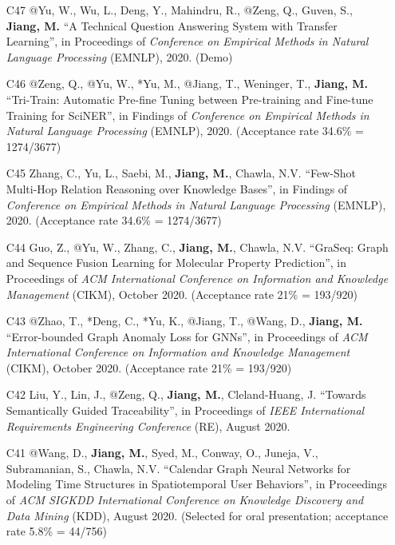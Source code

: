 \documentclass[10pt]{article}
\newenvironment{myindentpar}[1]%
{\begin{list}{}%
         {\setlength{\leftmargin}{#1}}%
         \item[]%
}
{\end{list}}
\newcounter{list}
\begin{document}
\begin{myindentpar}{0.00cm}
\begin{enumerate}[leftmargin=.5cm]
\item[C47] @Yu, W., Wu, L., Deng, Y., Mahindru, R., @Zeng, Q., Guven, S., \textbf{Jiang, M.} ``A Technical Question Answering System with Transfer Learning'', in Proceedings of \textit{Conference on Empirical Methods in Natural Language Processing} (EMNLP), 2020. (Demo)
		
\item[C46] @Zeng, Q., @Yu, W., *Yu, M., @Jiang, T., Weninger, T., \textbf{Jiang, M.} ``Tri-Train: Automatic Pre-fine Tuning between Pre-training and Fine-tune Training for SciNER'', in Findings of \textit{Conference on Empirical Methods in Natural Language Processing} (EMNLP), 2020. (Acceptance rate 34.6\% = 1274/3677)

\item[C45] Zhang, C., Yu, L., Saebi, M., \textbf{Jiang, M.}, Chawla, N.V. ``Few-Shot Multi-Hop Relation Reasoning over Knowledge Bases'', in Findings of \textit{Conference on Empirical Methods in Natural Language Processing} (EMNLP), 2020. (Acceptance rate 34.6\% = 1274/3677)

\item[C44] Guo, Z., @Yu, W., Zhang, C., \textbf{Jiang, M.}, Chawla, N.V. ``GraSeq: Graph and Sequence Fusion Learning for Molecular Property Prediction'', in Proceedings of \textit{ACM International Conference on Information and Knowledge Management} (CIKM), October 2020. (Acceptance rate 21\% = 193/920)
		
\item[C43] @Zhao, T., *Deng, C., *Yu, K., @Jiang, T., @Wang, D., \textbf{Jiang, M.} ``Error-bounded Graph Anomaly Loss for GNNs'', in Proceedings of \textit{ACM International Conference on Information and Knowledge Management} (CIKM), October 2020. (Acceptance rate 21\% = 193/920)

\item[C42] Liu, Y., Lin, J., @Zeng, Q., \textbf{Jiang, M.}, Cleland-Huang, J. ``Towards Semantically Guided Traceability'', in Proceedings of \textit{IEEE International Requirements Engineering Conference} (RE), August 2020.	

\item[C41] @Wang, D., \textbf{Jiang, M.}, Syed, M., Conway, O., Juneja, V., Subramanian, S., Chawla, N.V. ``Calendar Graph Neural Networks for Modeling Time Structures in Spatiotemporal User Behaviors'', in Proceedings of \textit{ACM SIGKDD International Conference on Knowledge Discovery and Data Mining} (KDD), August 2020. (Selected for oral presentation; acceptance rate 5.8\% = 44/756)


\end{enumerate}
\end{myindentpar}
\end{document}
